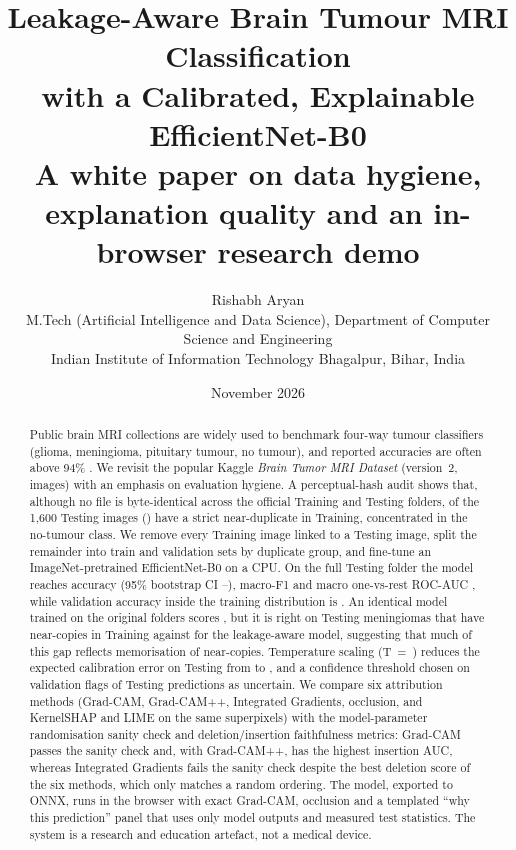 \documentclass[11pt,a4paper]{article}
\title{\textbf{Leakage-Aware Brain Tumour MRI Classification\\with a Calibrated, Explainable EfficientNet-B0}\\[4pt]\large A white paper on data hygiene, explanation quality and an in-browser research demo}
\author{Rishabh Aryan\\[2pt]
\small M.Tech (Artificial Intelligence and Data Science), Department of Computer Science and Engineering\\
\small Indian Institute of Information Technology Bhagalpur, Bihar, India}
\date{November 2026}
\begin{document}
\maketitle

\begin{abstract}
\noindent Public brain MRI collections are widely used to benchmark four-way tumour classifiers (glioma, meningioma, pituitary tumour, no tumour), and reported accuracies are often above 94\% \citep{deepak2019,swati2019,badza2020}. We revisit the popular Kaggle \emph{Brain Tumor MRI Dataset} (version~2, \DNImages{} images) with an emphasis on evaluation hygiene. A perceptual-hash audit shows that, although no file is byte-identical across the official Training and Testing folders, \DTestImgWithTrainDupStrict{} of the 1{,}600 Testing images (\StrictDupPct{}) have a strict near-duplicate in Training, concentrated in the no-tumour class. We remove every Training image linked to a Testing image, split the remainder into train and validation sets by duplicate group, and fine-tune an ImageNet-pretrained EfficientNet-B0 on a CPU. On the full Testing folder the model reaches \AccCFull{} accuracy (95\% bootstrap CI \AccLoCFull{}--\AccHiCFull{}), macro-F1 \FOneCFull{} and macro one-vs-rest ROC-AUC \AUCC{}, while validation accuracy inside the training distribution is \ValAccC{}. An identical model trained on the original folders scores \AccNFull{}, but it is right on \LBNMeningiomaDup{} Testing meningiomas that have near-copies in Training against \LBCMeningiomaDup{} for the leakage-aware model, suggesting that much of this gap reflects memorisation of near-copies. Temperature scaling (T~=~\TempC{}) reduces the expected calibration error on Testing from \ECERawC{} to \ECECalC{}, and a confidence threshold chosen on validation flags \UncRateC{} of Testing predictions as uncertain. We compare six attribution methods (Grad-CAM, Grad-CAM++, Integrated Gradients, occlusion, and KernelSHAP and LIME on the same superpixels) with the model-parameter randomisation sanity check and deletion/insertion faithfulness metrics: Grad-CAM passes the sanity check and, with Grad-CAM++, has the highest insertion AUC, whereas Integrated Gradients fails the sanity check despite the best deletion score of the six methods, which only matches a random ordering. The model, exported to ONNX, runs in the browser with exact Grad-CAM, occlusion and a templated ``why this prediction'' panel that uses only model outputs and measured test statistics. The system is a research and education artefact, not a medical device.
\end{abstract}
\end{document}
